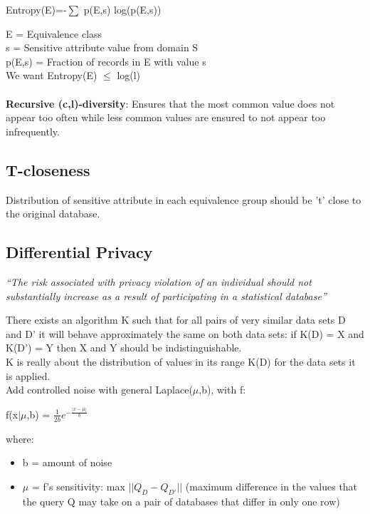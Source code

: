 \documentclass[a4paper]{article}
\begin{document}
\begin{center}
    Entropy(E)=-$\sum$ p(E,s) log(p(E,s))
\end{center}
E = Equivalence class\\
s = Sensitive attribute value from domain S\\
p(E,s) = Fraction of records in E with value s\\
We want Entropy(E) $\leq$ log(l)\\\\
\textbf{Recursive (c,l)-diversity}: Ensures that the most common value does not appear too often while less common values are ensured to not appear too infrequently.

\subsection{T-closeness}
Distribution of sensitive attribute in each equivalence group should be 't' close to the original database.

\subsection{Differential Privacy}
\begin{center}
    \textit{``The risk associated with privacy violation of an individual should not substantially increase as a result of participating in a statistical database''}
\end{center}
There exists an algorithm K such that for all pairs of very similar data sets D and D' it will behave approximately the same on both data sets: if K(D) = X and K(D') = Y then X and Y should be indistinguishable.\\
K is really about the distribution of values in its range K(D) for the data sets it is applied.\\
Add controlled noise with general Laplace($\mu$,b), with f:
\begin{center}
    f(x$|\mu$,b) = $\frac{1}{2b} e^{-\frac{|x-\mu|}{b}}$
\end{center}
where:
\begin{itemize}
    \item b = amount of noise
    \item $\mu$ = f's sensitivity: max $|| Q_D - Q_{D'}||$
    (maximum difference in the values that the query Q may take on a pair of databases that differ in only one row)
\end{itemize}
\end{document}
